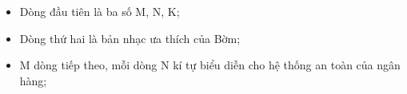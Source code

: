 \begin{itemize}
	\item     Dòng đầu tiên là ba số M, N, K;   
	\item     Dòng thứ hai là bản nhạc ưa thích của Bờm;   
	\item     M dòng tiếp theo, mỗi dòng N kí tự biểu diễn cho hệ thống an toàn của ngân hàng;   
\end{itemize}